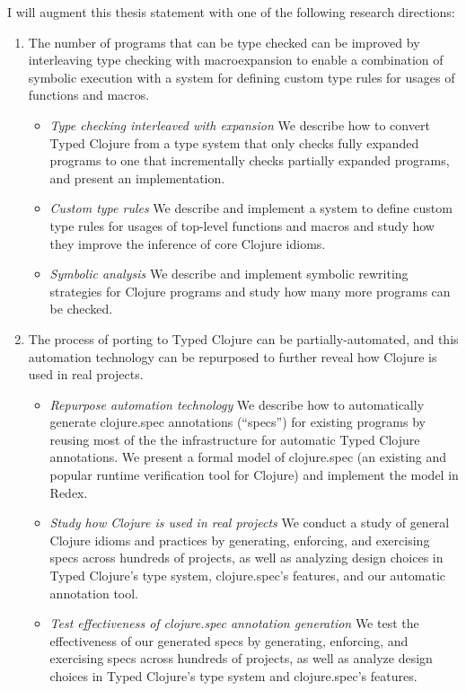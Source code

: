 I will augment this thesis statement with one of the following research directions:

\begin{enumerate}
  \item The number of programs that can be type checked can be improved by
    interleaving type checking with macroexpansion to enable a combination of
    symbolic execution with a system for defining custom type rules for usages of functions and macros.
    \begin{itemize}
      \item \emph{Type checking interleaved with expansion}
        We describe how to convert Typed Clojure from a type system that only checks fully
        expanded programs to one that incrementally
        checks partially expanded programs, and present an implementation.
      \item \emph{Custom type rules}
        We describe and implement a system to define custom type rules
        for usages of top-level functions and macros
        and study how they improve the inference of core Clojure idioms.
      \item \emph{Symbolic analysis}
        We describe and implement symbolic rewriting strategies for Clojure
        programs and study how many more programs can be checked.
    \end{itemize}
  \item The process of porting to Typed Clojure can be partially-automated, and this automation technology can be repurposed to further reveal how Clojure is used in real projects.
    \begin{itemize}
      \item \emph{Repurpose automation technology}
        We describe how to automatically generate clojure.spec annotations (``specs'') for existing programs by reusing
        most of the the infrastructure for automatic Typed Clojure annotations.
        We present a formal model of clojure.spec (an existing and popular runtime verification tool for Clojure)
        and implement the model in Redex.
      \item \emph{Study how Clojure is used in real projects}
        We conduct a study of general Clojure idioms and practices by generating, enforcing, and exercising specs
        across hundreds of projects, as well as analyzing design choices in Typed Clojure's type system,
        clojure.spec's features, and our automatic annotation tool.
      \item \emph{Test effectiveness of clojure.spec annotation generation}
        We test the effectiveness of our generated specs by generating, enforcing, and exercising specs
        across hundreds of projects, as well as analyze design choices in Typed Clojure's type system and
        clojure.spec's features.
    \end{itemize}
\end{enumerate}

